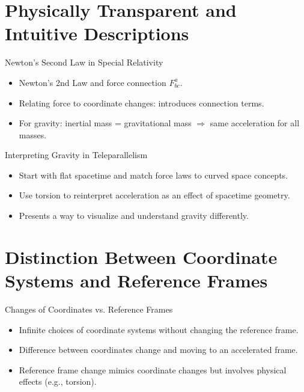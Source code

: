 \documentclass{beamer}
\begin{document}
\section{Physically Transparent and Intuitive Descriptions}

\begin{frame}{Newton's Second Law in Special Relativity}
  \begin{itemize}
    \item Newton's 2nd Law and force connection \( F^a_{bc} \).
    \item Relating force to coordinate changes: introduces connection terms.
    \item For gravity: inertial mass = gravitational mass $\Rightarrow$ same acceleration for all masses.
  \end{itemize}
\end{frame}

\begin{frame}{Interpreting Gravity in Teleparallelism}
  \begin{itemize}
    \item Start with flat spacetime and match force laws to curved space concepts.
    \item Use torsion to reinterpret acceleration as an effect of spacetime geometry.
    \item Presents a way to visualize and understand gravity differently.
  \end{itemize}
\end{frame}

\section{Distinction Between Coordinate Systems and Reference Frames}

\begin{frame}{Changes of Coordinates vs. Reference Frames}
  \begin{itemize}
    \item Infinite choices of coordinate systems without changing the reference frame.
    \item Difference between coordinates change and moving to an accelerated frame.
    \item Reference frame change mimics coordinate changes but involves physical effects (e.g., torsion).
  \end{itemize}
\end{frame}
\end{document}
